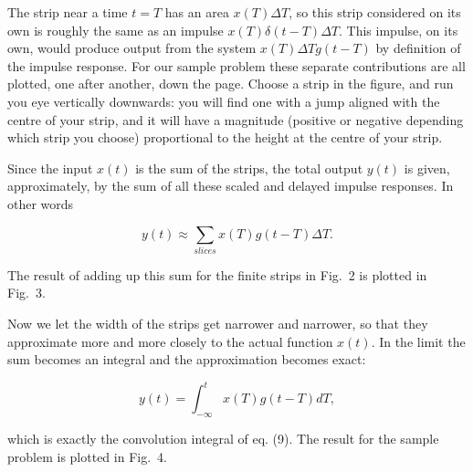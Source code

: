   The strip near a time $t=T$ has an area $x(T) \Delta T$, so this strip 
  considered on its own is roughly the same as an impulse $x(T) \delta(t-T) 
  \Delta T$. This impulse, on its own, would produce output from the system 
  $x(T) \Delta T g(t-T)$ by definition of the impulse response. For our sample 
  problem these separate contributions are all plotted, one after another, down 
  the page. Choose a strip in the figure, and run you eye vertically downwards: 
  you will find one with a jump aligned with the centre of your strip, and it 
  will have a magnitude (positive or negative depending which strip you choose) 
  proportional to the height at the centre of your strip. 

  Since the input $x(t)$ is the sum of the strips, the total output $y(t)$ is 
  given, approximately, by the sum of all these scaled and delayed impulse 
  responses. In other words 

  $$y(t) \approx \sum_{slices}{x(T) g(t-T) \Delta T} . \tag{11}$$ 

  The result of adding up this sum for the finite strips in Fig.\ 2 is plotted 
  in Fig.\ 3. 

  Now we let the width of the strips get narrower and narrower, so that they 
  approximate more and more closely to the actual function $x(t)$. In the limit 
  the sum becomes an integral and the approximation becomes exact: 

  $$y(t)=\int_{-\infty}^{t}{x(T) g(t-T) dT} , \tag{12}$$ 

  which is exactly the convolution integral of eq. (9). The result for the 
  sample problem is plotted in Fig.\ 4. 